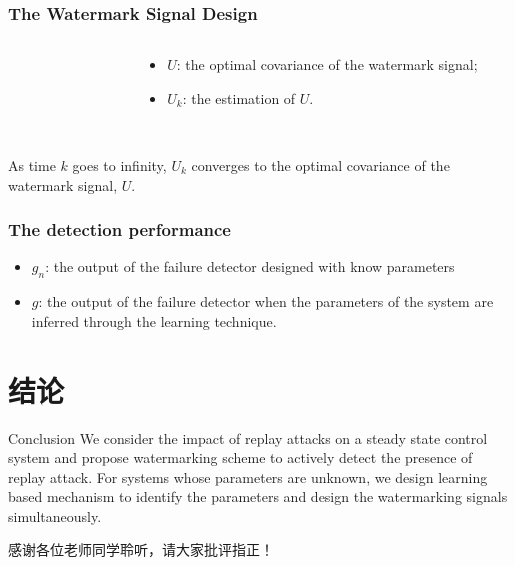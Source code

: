 \documentclass[10pt]{beamer}
\newcommand{\tikzdir}[1]{#1.tikz}
\newcommand{\inputtikz}[1]{}}
\begin{document}
\begin{frame}
  \frametitle{The Watermark Signal Design}
  \begin{columns}
    \begin{column}{0.6\textwidth}
      \begin{figure}[h!]
         \inputtikz{errU1_te}
      \end{figure}
    \end{column}
    \begin{column}{0.4\textwidth}
      \begin{itemize}
      \item $U$: the optimal covariance of the watermark signal;
      \item $U_k$: the estimation of $U$.
      \end{itemize}
    \end{column}
  \end{columns}
  ~\\
  As time $k$ goes to infinity, $U_k$ converges to the optimal covariance of the watermark signal, $U$.
\end{frame}

\begin{frame}
  \frametitle{The detection performance}
  \begin{itemize}
  \item $g_n$: the output of the failure detector designed with know parameters
  \item $g$: the output of the failure detector when the parameters of the system are inferred through the learning technique. 
  \end{itemize}
  \begin{figure}[h!]
    \centering
    \inputtikz{gng_te}
  \end{figure}
\end{frame}

\section{结论}

\begin{frame}{Conclusion}
  We consider the impact of replay attacks on a steady state control system and propose watermarking scheme to actively detect the presence of replay attack. For systems whose parameters are unknown, we design learning based mechanism to identify the parameters and design the watermarking signals simultaneously.
\end{frame}

\begin{frame}[standout]
  感谢各位老师同学聆听，请大家批评指正！
\end{frame}
\end{document}
